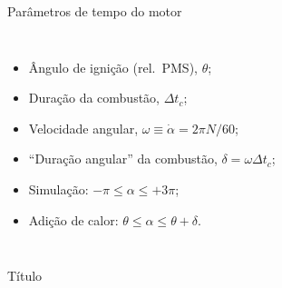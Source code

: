     \begin{frame}{Parâmetros de tempo do motor}\vspace*{-2em}
        \begin{columns}
        \begin{itemize}
            \item<1-> \alert{Ângulo} de ignição (rel.~PMS), \alert{$\theta$};
            \item<2-> \alert{Duração} da combustão, \alert{$\Delta t_c$};
            \item<3-> \alert{Velocidade angular}, \alert{$\omega \equiv \dot\alpha = 2\pi N/60$};
            \item<4-> ``\alert{Duração angular}'' da combustão, \alert{$\delta = \omega\Delta t_c$};
            \item<5-> Simulação: \alert{$-\pi \leqslant \alpha \leqslant +3\pi$};
            \item<6-> Adição de calor: \alert{$\theta \leqslant \alpha \leqslant \theta+\delta$}.
        \end{itemize}
        \begin{center}
        \end{center}
        \end{columns}
    \end{frame}

    \begin{frame}{Título}\vspace*{-2em}
        \begin{columns}
        \end{columns}
    \end{frame}

